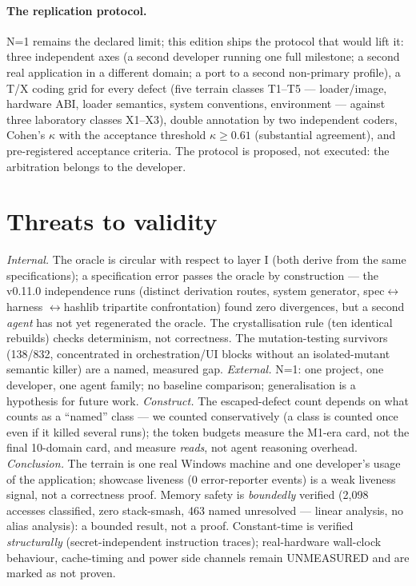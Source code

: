 \documentclass[11pt,a4paper]{article}
\begin{document}
\paragraph{The replication protocol.} N=1 remains the declared limit;
this edition ships the protocol that would lift it: three independent
axes (a second developer running one full milestone; a second real
application in a different domain; a port to a second non-primary
profile), a T/X coding grid for every defect (five terrain classes T1--T5
--- loader/image, hardware ABI, loader semantics, system conventions,
environment --- against three laboratory classes X1--X3), double
annotation by two independent coders, Cohen's $\kappa$ with the
acceptance threshold $\kappa \ge 0.61$ (substantial agreement), and
pre-registered acceptance criteria. The protocol is proposed, not
executed: the arbitration belongs to the developer.

\section{Threats to validity}\label{sec:threats}

\emph{Internal.} The oracle is circular with respect to layer I
(both derive from the same specifications); a specification error passes
the oracle by construction --- the v0.11.0 independence runs (distinct
derivation routes, system generator, spec$\leftrightarrow$harness
$\leftrightarrow$hashlib tripartite confrontation) found zero
divergences, but a second \emph{agent} has not yet regenerated the
oracle. The crystallisation rule (ten identical rebuilds) checks
determinism, not correctness. The mutation-testing survivors (138/832,
concentrated in orchestration/UI blocks without an isolated-mutant
semantic killer) are a named, measured gap. \emph{External.} N=1: one
project, one developer, one agent family; no baseline comparison;
generalisation is a hypothesis for future work. \emph{Construct.} The
escaped-defect count depends on what counts as a ``named'' class --- we
counted conservatively (a class is counted once even if it killed several
runs); the token budgets measure the M1-era card, not the final
10-domain card, and measure \emph{reads}, not agent reasoning overhead.
\emph{Conclusion.} The terrain is one real Windows machine and one
developer's usage of the application; showcase liveness (0 error-reporter
events) is a weak liveness signal, not a correctness proof. Memory safety
is \emph{boundedly} verified (2{,}098 accesses classified, zero
stack-smash, 463 named unresolved --- linear analysis, no alias
analysis): a bounded result, not a proof. Constant-time is verified
\emph{structurally} (secret-independent instruction traces); real-hardware
wall-clock behaviour, cache-timing and power side channels remain
UNMEASURED and are marked as not proven.
\end{document}
